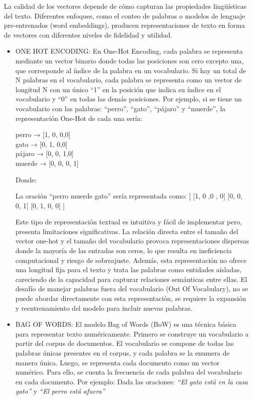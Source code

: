 La calidad de los vectores depende de cómo capturan las propiedades lingüísticas del texto. Diferentes enfoques, como el conteo de palabras o modelos de lenguaje pre-entrenados (word embeddings), producen representaciones de texto en forma de vectores con diferentes niveles de fidelidad y utilidad.

\begin{itemize}

	\item ONE HOT ENCODING: En One-Hot Encoding, cada palabra se representa mediante un vector binario donde todas las posiciones son cero excepto una, que corresponde al índice de la palabra en un vocabulario. Si hay un total de N palabras en el vocabulario, cada palabra se representa como un vector de longitud
N con un único ``1'' en la posición que indica su índice en el vocabulario y ``0'' en todas las demás posiciones. Por ejemplo, si se tiene un vocabulario con las palabras: ``perro'', ``gato'', ``pájaro'' y ``muerde'', la representación One-Hot de cada una sería:
\begin{Center}
	perro → [1, 0, 0,0]\\
	gato → [0, 1, 0,0]\\
	pájaro → [0, 0, 1,0]\\
	muerde → [0, 0, 0, 1]\\
	
\end{Center}

Donde:

La oración ``perro muerde gato'' sería representada como: [   [1, 0 ,0 , 0]   [0, 0, 0, 1]   [0, 1, 0, 0]  ]


Este tipo de representación textual  es intuitiva y fácil de implementar pero, presenta limitaciones significativas. La relación directa entre el tamaño del vector one-hot y el tamaño del vocabulario provoca representaciones dispersas donde la mayoría de las entradas son ceros, lo que resulta en ineficiencia computacional y riesgo de sobreajuste. Además, esta representación no ofrece una longitud fija para el texto y trata las palabras como entidades aisladas, careciendo de la capacidad para capturar relaciones semánticas entre ellas. El desafío de manejar palabras fuera del vocabulario (Out Of Vocabulary), no se puede abordar directamente con esta representación, se requiere la expansión y reentrenamiento del modelo para incluir nuevas palabras.

	\item BAG OF WORDS: El modelo Bag of Words (BoW) es una técnica básica  para representar texto numéricamente. Primero  se construye un vocabulario a partir del corpus de documentos. El vocabulario se compone de todas las palabras únicas presentes en el corpus, y cada palabra se la enumera de manera única. Luego, se representa cada documento como un vector numérico. Para ello, se cuenta la frecuencia de cada palabra del vocabulario en cada documento. Por ejemplo: 
Dada las oraciones: \textit{``El gato está en la casa gato''} y \textit{``El perro está afuera''}


\end{itemize}
